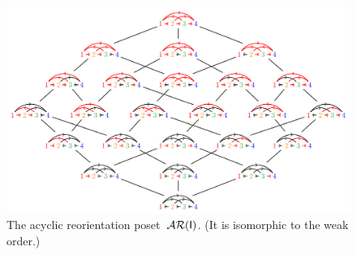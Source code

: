 \documentclass{amsart}
\theoremstyle{definition}
\renewcommand{\c}[1]{\mathcal{#1}} %
\DeclareMathOperator{\AReori}{\c{AR}}  %
\newcommand{\Igraph}{\sf I} %
\begin{document}
\begin{figure}
	\centerline{\includegraphics[scale=.68]{acyclicReorientationsI}}
	\caption{The acyclic reorientation poset~$\AReori(\Igraph)$. (It is isomorphic to the weak order.)}
	\label{fig:acyclicReorientationsI}
\end{figure}
\end{document}
